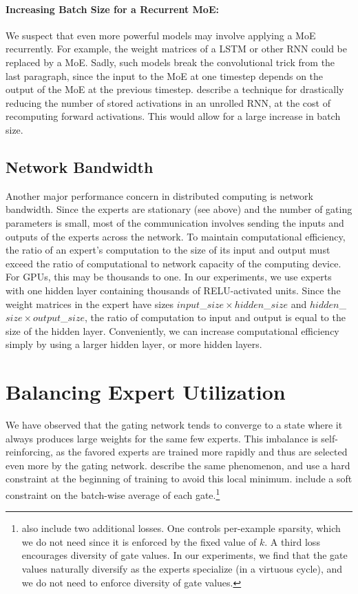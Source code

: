 \documentclass{article}
\begin{document}
\paragraph{Increasing Batch Size for a Recurrent MoE:}  We suspect that even more powerful models may involve applying a MoE recurrently.  For example, the weight matrices of a LSTM or other RNN could be replaced by a MoE.   Sadly, such models break the convolutional trick from the last paragraph, since the input to the MoE at one timestep depends on the output of the MoE at the previous timestep.  \cite{Gruslys16} describe a technique for drastically reducing the number of stored activations in an unrolled RNN, at the cost of recomputing forward activations.   This would allow for a large increase in batch size.

\subsection{Network Bandwidth}
Another major performance concern in distributed computing is network bandwidth.  Since the experts are stationary (see above) and the number of gating parameters is small, most of the communication involves sending the inputs and outputs of the experts across the network.  To maintain computational efficiency, the ratio of an expert's computation to the size of its input and output must exceed the ratio of computational to network capacity of the computing device.   For GPUs, this may be thousands to one.  In our experiments, we use experts with one hidden layer containing thousands of RELU-activated units.  Since the weight matrices in the expert have sizes $input$\_${size} \times hidden$\_${size}$ and $hidden$\_${size} \times output$\_${size}$, the ratio of computation to input and output is equal to the size of the hidden layer.  Conveniently, we can increase computational efficiency simply by using a larger hidden layer, or more hidden layers.

\section{Balancing Expert Utilization}  
\label{sec:losses}

We have observed that the gating network tends to converge to a state where it always produces large weights for the same few experts.  This imbalance is self-reinforcing, as the favored experts are trained more rapidly and thus are selected even more by the gating network.   \cite{eigen2013learning} describe the same phenomenon, and use a hard constraint at the beginning of training to avoid this local minimum.  \cite{Bengio15:CondComp} include a soft constraint on the batch-wise average of each gate.\footnote{\cite{Bengio15:CondComp} also include two additional losses.  One controls per-example sparsity, which we do not need since it is enforced by the fixed value of $k$.  A third loss encourages diversity of gate values.  In our experiments, we find that the gate values naturally diversify as the experts specialize (in a virtuous cycle), and we do not need to enforce diversity of gate values.}
\end{document}
